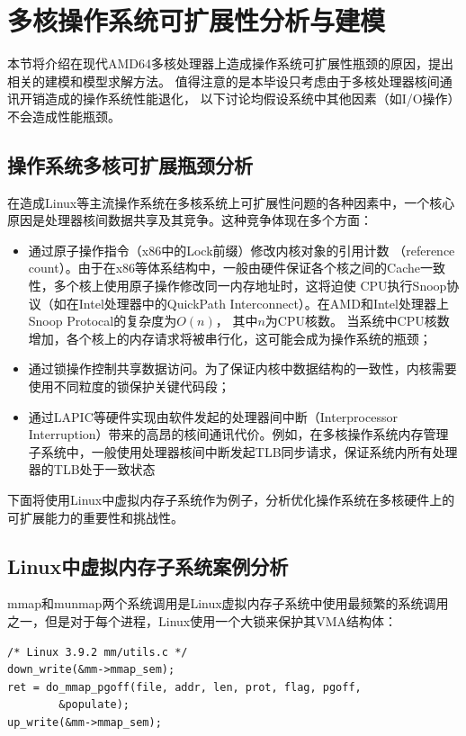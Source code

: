 
\chapter{多核操作系统可扩展性分析与建模}

本节将介绍在现代AMD64多核处理器上造成操作系统可扩展性瓶颈的原因，提出相关的建模和模型求解方法。
值得注意的是本毕设只考虑由于多核处理器核间通讯开销造成的操作系统性能退化，
以下讨论均假设系统中其他因素（如I/O操作）不会造成性能瓶颈。

\section{操作系统多核可扩展瓶颈分析}

在造成Linux等主流操作系统在多核系统上可扩展性问题的各种因素中，一个核心原因是处理器核间数据共享及其竞争。这种竞争体现在多个方面：

\begin{itemize}
\item 通过原子操作指令（x86中的Lock前缀）修改内核对象的引用计数
（reference count）。由于在x86等体系结构中，一般由硬件保证各个核之间的Cache一致性，多个核上使用原子操作修改同一内存地址时，这将迫使
CPU执行Snoop协议（如在Intel处理器中的QuickPath Interconnect）。在AMD和Intel处理器上Snoop Protocal的复杂度为$O(n)$\cite{intelquickpath}，
其中$n$为CPU核数。
当系统中CPU核数增加，各个核上的内存请求将被串行化，这可能会成为操作系统的瓶颈；
\item 通过锁操作控制共享数据访问。为了保证内核中数据结构的一致性，内核需要使用不同粒度的锁保护关键代码段；
\item 通过LAPIC等硬件实现由软件发起的处理器间中断（Interprocessor Interruption）带来的高昂的核间通讯代价。例如，在多核操作系统内存管理子系统中，一般使用处理器核间中断发起TLB同步请求，保证系统内所有处理器的TLB处于一致状态
\end{itemize}

下面将使用Linux中虚拟内存子系统作为例子，分析优化操作系统在多核硬件上的可扩展能力的重要性和挑战性。

\section{Linux中虚拟内存子系统案例分析}

mmap和munmap两个系统调用是Linux虚拟内存子系统中使用最频繁的系统调用之一，但是对于每个进程，Linux使用一个大锁来保护其VMA结构体：

\begin{lstlisting}
/* Linux 3.9.2 mm/utils.c */
down_write(&mm->mmap_sem);
ret = do_mmap_pgoff(file, addr, len, prot, flag, pgoff,
		&populate);
up_write(&mm->mmap_sem);
\end{lstlisting}

